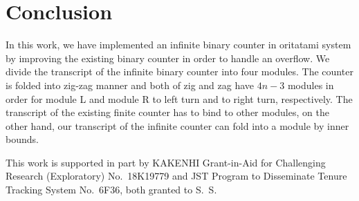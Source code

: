 \documentclass[twocolumn]{svjour3}
\begin{document}
\section{Conclusion}
In this work, we have implemented an infinite binary counter in oritatami system by improving the existing binary counter in order to handle an overflow.
We divide the transcript of the infinite binary counter into four modules.
The counter is folded into zig-zag manner and both of zig and zag have $4n{-}3$ modules in order for module L and module R to left turn and to right turn, respectively.
The transcript of the existing finite counter has to bind to other modules, on the other hand, our transcript of the infinite counter can fold into a module by inner bounds.



\begin{acknowledgements}
This work is supported in part by KAKENHI Grant-in-Aid for Challenging Research (Exploratory) No.~18K19779 and JST Program to Disseminate Tenure Tracking System No.~6F36, both granted to S.~S.
\end{acknowledgements}


\end{document}

